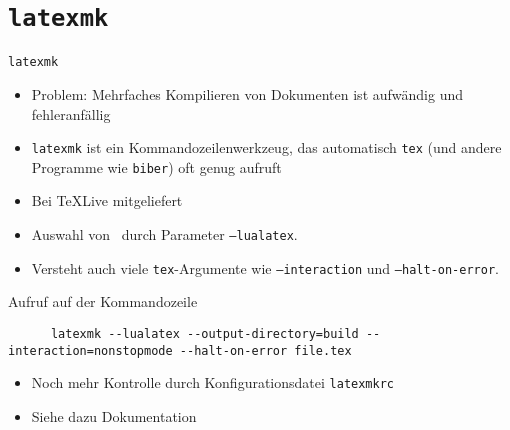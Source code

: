 \section{\texttt{latexmk}}

\begin{frame}[fragile]{
  \texttt{latexmk}
  \hfill
}
  \begin{itemize}
    \item Problem: Mehrfaches Kompilieren von Dokumenten ist aufwändig und fehleranfällig
    \item \texttt{latexmk} ist ein Kommandozeilenwerkzeug, das automatisch \texttt{tex} (und andere Programme wie \texttt{biber}) oft genug aufruft
    \item Bei TeXLive mitgeliefert
    \item Auswahl von \LuaLaTeX\ durch Parameter \texttt{--lualatex}.
    \item Versteht auch viele \texttt{tex}-Argumente wie \texttt{--interaction} und \texttt{--halt-on-error}.
  \end{itemize}

  \begin{block}{Aufruf auf der Kommandozeile}
    \begin{lstlisting}
      latexmk --lualatex --output-directory=build --interaction=nonstopmode --halt-on-error file.tex
    \end{lstlisting}
  \end{block}

  \begin{itemize}
    \item Noch mehr Kontrolle durch Konfigurationsdatei \texttt{latexmkrc}
    \item Siehe dazu Dokumentation
  \end{itemize}
\end{frame}

